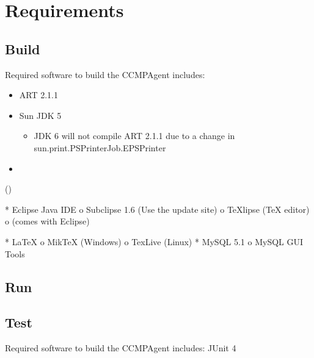 \section{Requirements}

\subsection{Build}

Required software to build the CCMPAgent includes:
\begin{itemize}
  \item ART 2.1.1
  \item Sun JDK 5
  \begin{itemize}
    \item JDK 6 will not compile ART 2.1.1 due to a change in
sun.print.PSPrinterJob.EPSPrinter
  \end{itemize}
  \item 
\end{itemize}
 ()

    * Eclipse Java IDE
          o Subclipse 1.6 (Use the update site)
          o TeXlipse (TeX editor)
          o  (comes with Eclipse)

    * LaTeX
          o MikTeX (Windows)
          o TexLive (Linux)
    * MySQL 5.1
          o MySQL GUI Tools


\subsection{Run}


\subsection{Test}
Required software to build the CCMPAgent includes:
JUnit 4